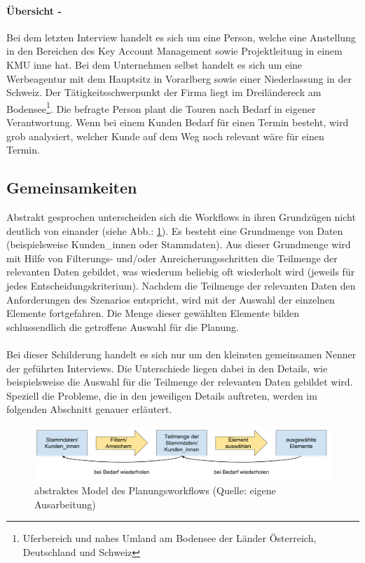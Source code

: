 \documentclass[Bachelorarbeit.tex]{subfiles}
\begin{document}
\paragraph*{Übersicht - }
Bei dem letzten Interview handelt es sich um eine Person, welche eine Anstellung in den Bereichen des Key Account Management sowie Projektleitung in einem \ac{KMU} inne hat.
Bei dem Unternehmen selbst handelt es sich um eine Werbeagentur mit dem Hauptsitz in Vorarlberg sowie einer Niederlassung in der Schweiz.
Der Tätigkeitsschwerpunkt der Firma liegt im Dreiländereck am Bodensee\footnote{Uferbereich und nahes Umland am Bodensee der Länder Österreich, Deutschland und Schweiz}. 
Die befragte Person plant die Touren nach Bedarf in eigener Verantwortung.
Wenn bei einem Kunden Bedarf für einen Termin besteht, wird grob analysiert, welcher Kunde auf dem Weg noch relevant wäre für einen Termin.

\subsection{Gemeinsamkeiten}
\label{subsubsec:Ergebnisse der Interviews:gemeinsamkeiten}
Abstrakt gesprochen unterscheiden sich die Workflows in ihren Grundzügen nicht deutlich von einander (siehe Abb.: \ref{fig:abstrakterWorkflowPlannung}). 
Es besteht eine Grundmenge von Daten (beispielsweise Kunden\_innen oder Stammdaten). 
Aus dieser Grundmenge wird mit Hilfe von Filterungs- und/oder Anreicherungsschritten die Teilmenge der relevanten Daten gebildet, was wiederum beliebig oft wiederholt wird (jeweils für jedes Entscheidungskriterium).
Nachdem die Teilmenge der relevanten Daten den Anforderungen des Szenarios entspricht, wird mit der Auswahl der einzelnen Elemente fortgefahren.
Die Menge dieser gewählten Elemente bilden schlussendlich die getroffene Auswahl für die Planung.\\
\\
Bei dieser Schilderung handelt es sich nur um den kleinsten gemeinsamen Nenner der geführten Interviews.
Die Unterschiede liegen dabei in den Details, wie beispielsweise die Auswahl für die Teilmenge der relevanten Daten gebildet wird.
Speziell die Probleme, die in den jeweiligen Details auftreten, werden im folgenden Abschnitt genauer erläutert.

\begin{figure}[h]
	\includegraphics[width=\linewidth]{img/analyse/abstrakterWorkflowPlannung}
	\caption[abstrakter Planungsworkflow]{abstraktes Model des Planungsworkflows (Quelle: eigene Ausarbeitung)}
	\label{fig:abstrakterWorkflowPlannung}
\end{figure}
\end{document}
